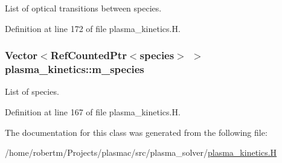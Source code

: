 List of optical transitions between species. 



Definition at line 172 of file plasma\+\_\+kinetics.\+H.

\subsubsection[{\texorpdfstring{m\+\_\+species}{m_species}}]{\setlength{\rightskip}{0pt plus 5cm}Vector$<$Ref\+Counted\+Ptr$<${\bf species}$>$ $>$ plasma\+\_\+kinetics\+::m\+\_\+species\hspace{0.3cm}{\ttfamily [protected]}}\hypertarget{classplasma__kinetics_a25a67ec0e29bd259a597f3e998dffd75}{}\label{classplasma__kinetics_a25a67ec0e29bd259a597f3e998dffd75}


List of species. 



Definition at line 167 of file plasma\+\_\+kinetics.\+H.



The documentation for this class was generated from the following file\+:\begin{DoxyCompactItemize}
\item 
/home/robertm/\+Projects/plasmac/src/plasma\+\_\+solver/\hyperlink{plasma__kinetics_8H}{plasma\+\_\+kinetics.\+H}\end{DoxyCompactItemize}
